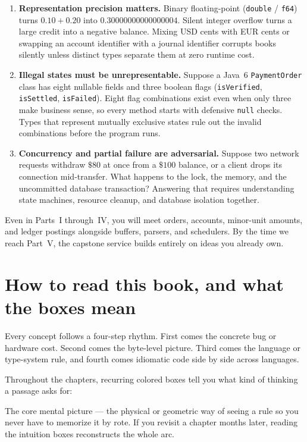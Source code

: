\begin{enumerate}
  \item \textbf{Representation precision matters.} Binary floating-point (\texttt{double} / \texttt{f64}) turns $0.10 + 0.20$ into $0.30000000000000004$. Silent integer overflow turns a large credit into a negative balance. Mixing USD cents with EUR cents or swapping an account identifier with a journal identifier corrupts books silently unless distinct types separate them at zero runtime cost.
  \item \textbf{Illegal states must be unrepresentable.} Suppose a Java~6 \texttt{PaymentOrder} class has eight nullable fields and three boolean flags (\texttt{isVerified}, \texttt{isSettled}, \texttt{isFailed}). Eight flag combinations exist even when only three make business sense, so every method starts with defensive \texttt{null} checks. Types that represent mutually exclusive states rule out the invalid combinations before the program runs.
  \item \textbf{Concurrency and partial failure are adversarial.} Suppose two network requests withdraw $\$80$ at once from a $\$100$ balance, or a client drops its connection mid-transfer. What happens to the lock, the memory, and the uncommitted database transaction? Answering that requires understanding state machines, resource cleanup, and database isolation together.
\end{enumerate}

Even in Parts~I through~IV, you will meet orders, accounts, minor-unit amounts, and ledger postings alongside buffers, parsers, and schedulers. By the time we reach Part~V, the capstone service builds entirely on ideas you already own.

\section*{How to read this book, and what the boxes mean}

Every concept follows a four-step rhythm. First comes the concrete bug or hardware cost. Second comes the byte-level picture. Third comes the language or type-system rule, and fourth comes idiomatic code side by side across languages.

Throughout the chapters, recurring colored boxes tell you what kind of thinking a passage asks for:

\begin{intuitionbox}
The core mental picture --- the physical or geometric way of seeing a rule so you never have to memorize it by rote. If you revisit a chapter months later, reading the intuition boxes reconstructs the whole arc.
\end{intuitionbox}

